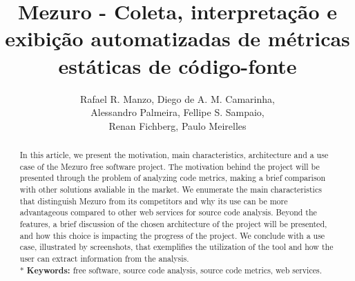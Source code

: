\documentclass[12pt]{article}
\begin{document}
\sloppy
\singlespacing
\title{Mezuro - Coleta, interpretação e exibição automatizadas de métricas estáticas de código-fonte}

\author{Rafael R. Manzo, Diego de A. M. Camarinha,\\
        Alessandro Palmeira, Fellipe S. Sampaio,\\
        Renan Fichberg, Paulo Meirelles}

\address{Instituto de Matemática e Estatística -- Universidade de São Paulo (USP)\\
  Rua do Matão, 1010 -- 05508-090 -- Cidade Universitária -- São Paulo -- SP -- Brasil
\nextinstitute
  Faculdade de Engenharia -- UnB Gama (FGA)\\
  Gama -- DF -- Brasil
}

\maketitle
\begin{abstract}
  In this article, we present the motivation, main characteristics, architecture and a use case of the Mezuro free software project.
  The motivation behind the project will be presented through the problem of analyzing code metrics, making a brief comparison with
  other solutions avaliable in the market.
  We enumerate the main characteristics that distinguish Mezuro from its competitors and why its use can be more advantageous compared to other
  web services for source code analysis.
  Beyond the features, a brief discussion of the chosen architecture of the project will be presented, and how this choice is impacting the progress of the project.
  We conclude with a use case, illustrated by screenshots, that exemplifies the utilization of the tool and how the user can extract information from the analysis.
  \\*
  \textbf{Keywords:} free software, source code analysis, source code metrics, web services.
\end{abstract}
\end{document}
